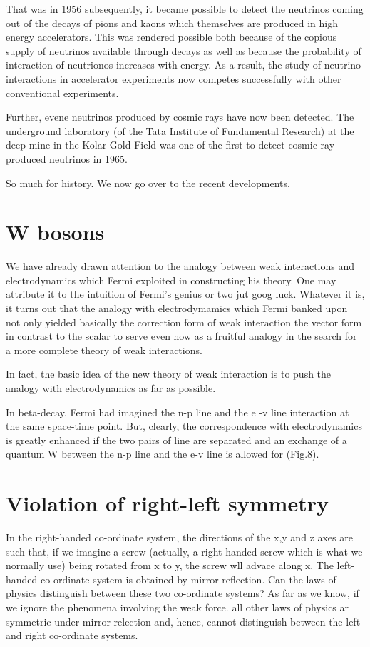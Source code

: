 That was in 1956 subsequently, it became possible to detect the neutrinos coming out of the decays of pions and kaons which themselves are produced in high energy accelerators. This was rendered possible both because of the copious supply of neutrinos available through decays as well as because the probability of interaction of neutrionos increases with energy. As a result, the study of neutrino-interactions in accelerator experiments now competes successfully with other conventional experiments.

Further, evene neutrinos produced by cosmic rays have now been detected. The underground laboratory (of the Tata Institute of Fundamental Research) at the deep mine in the Kolar Gold Field was one of the first to detect cosmic-ray-produced neutrinos in 1965.

So much for history. We now go over to the recent developments.

\section*{W bosons}

We have already drawn attention to the analogy between weak interactions and electrodynamics which Fermi exploited in constructing his theory. One may attribute it to the intuition of Fermi's genius or two jut goog luck. Whatever it is, it turns out that the analogy with electrodymamics which Fermi banked upon not only yielded basically the correction form of weak interaction the vector form in contrast to the scalar to serve even now as a fruitful analogy in the search for a more complete theory of weak interactions.

In fact, the basic idea of the new theory of weak interaction is to push the analogy with electrodynamics as far as possible.

In beta-decay, Fermi had imagined the n-p line and the e -v line interaction at the same space-time point. But, clearly, the correspondence with electrodynamics is greatly enhanced if the two pairs of line are separated and an exchange of a quantum W between the n-p line and the e-v line is allowed for (Fig.8).

\section*{Violation of right-left symmetry}

In the right-handed co-ordinate system, the directions of the x,y and z axes are such that, if we imagine a screw (actually, a right-handed screw which is what we normally use) being rotated from x to y, the screw wll advace along x. The left-handed co-ordinate system is obtained by mirror-reflection. Can the laws of physics distinguish between these two co-ordinate systems? As far as we know, if we ignore the phenomena involving the weak force. all other laws of physics ar symmetric under mirror relection and, hence, cannot distinguish between the left and right co-ordinate systems.


